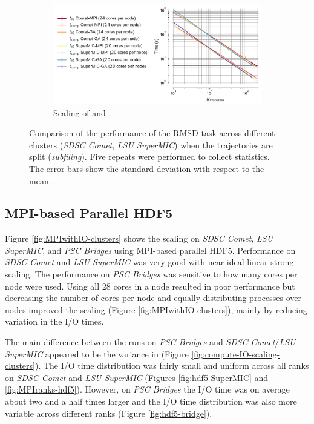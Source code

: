 \begin{figure}[!htb]
  \begin{subfigure}{0.7\textwidth}
    \includegraphics[width=\linewidth]{figures/Clusters_IO_compute_scaling_splitting.pdf}
    \captionsetup{format=hang}
    \caption{Scaling of \tcomp and \tIO.}
    \label{fig:compute-IO-scaling-clusters-splitting}
  \end{subfigure}
  \caption{Comparison of the performance of the RMSD task across different clusters (\emph{SDSC Comet}, \emph{LSU SuperMIC}) when the trajectories are split (\emph{subfiling}).
    Five repeats were performed to collect statistics.
    The error bars show the standard deviation with respect to the mean.}
\label{fig:MPI-splitting-clusters}
\end{figure} 

\subsection{MPI-based Parallel HDF5}

Figure \ref{fig:MPIwithIO-clusters} shows the scaling on \emph{SDSC Comet}, \emph{LSU SuperMIC}, and \emph{PSC Bridges} using MPI-based parallel HDF5.  
Performance on \emph{SDSC Comet} and \emph{LSU SuperMIC} was very good with near ideal linear strong scaling.
The performance on \emph{PSC Bridges} was sensitive to how many cores per node were used.
Using all 28 cores in a node resulted in poor performance but decreasing the number of cores per node and equally distributing processes over nodes improved the scaling (Figure \ref{fig:MPIwithIO-clusters}), mainly by reducing variation in the I/O times.

The main difference between the runs on \emph{PSC Bridges} and \emph{SDSC Comet}/\emph{LSU SuperMIC} appeared to be the variance in \tIO (Figure \ref{fig:compute-IO-scaling-clusters}).
The I/O time distribution was fairly small and uniform across all ranks on \emph{SDSC Comet} and \emph{LSU SuperMIC} (Figures \ref{fig:hdf5-SuperMIC} and \ref{fig:MPIranks-hdf5}).
However, on \emph{PSC Bridges} the I/O time was on average about two and a half times larger and the I/O time distribution was also more variable across different ranks (Figure \ref{fig:hdf5-bridge}).  

